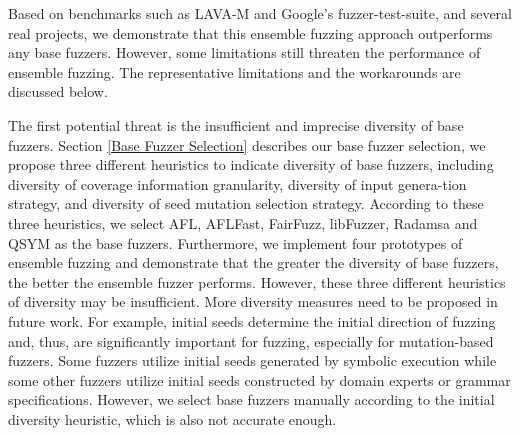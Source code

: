 
Based on benchmarks such as LAVA-M and Google's fuzzer-test-suite, and several real projects, we demonstrate that this ensemble fuzzing approach outperforms any base fuzzers. However, some limitations still threaten the performance of ensemble fuzzing. The representative limitations and the workarounds are discussed below.



The first potential threat is the insufficient and imprecise diversity of base fuzzers. Section \ref{Base Fuzzer Selection} describes our base fuzzer selection, we propose three different heuristics  to indicate  diversity of base fuzzers, including diversity of coverage information granularity, diversity of input genera-tion strategy, and diversity of seed mutation selection strategy.
According to these three heuristics, we select AFL, AFLFast, FairFuzz, libFuzzer, Radamsa and QSYM as the base fuzzers. %
Furthermore, we implement four prototypes of ensemble fuzzing and demonstrate that the greater the diversity of base fuzzers, the better the ensemble fuzzer performs. However, these three different heuristics of diversity may be insufficient. More diversity measures need to be proposed in future work. For example, initial seeds determine the initial direction of fuzzing and, thus, are significantly important for fuzzing, especially for mutation-based fuzzers. Some fuzzers utilize initial seeds generated by symbolic execution \cite{wang2018safl, ognawala2018improving} while some other fuzzers utilize initial seeds constructed by domain experts or grammar specifications. However, we select base fuzzers manually according to the initial diversity heuristic, which is also not accurate enough. 

